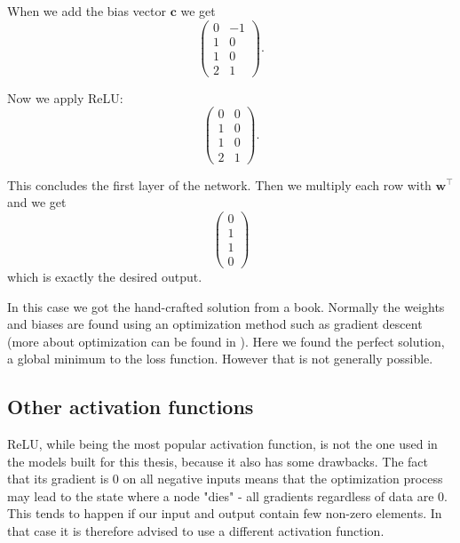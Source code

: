 When we add the bias vector $\textbf{c}$ we get 
$$
\left(\begin{matrix}
	0 & -1\\
	1 & 0\\
	1 & 0\\
	2 & 1
\end{matrix}\right).$$

Now we apply ReLU:
$$
\left(\begin{matrix}
	0 & 0\\
	1 & 0\\
	1 & 0\\
	2 & 1
\end{matrix}\right).$$

This concludes the first layer of the network. Then we multiply each row with $\textbf{w}^\top$ and we get
$$	
\left(\begin{matrix}
	0\\
	1\\
	1\\
	0
\end{matrix}\right)$$
which is exactly the desired output.

In this case we got the hand-crafted solution from a book. Normally the weights and biases are found using an optimization method such as gradient descent (more about optimization can be found in ). Here we found the perfect solution, a global minimum to the loss function. However that is not generally possible.

\subsection{Other activation functions}
\label{section:activation_functions}
ReLU, while being the most popular activation function, is not the one used in the models built for this thesis, because it also has some drawbacks. The fact that its gradient is $0$ on all negative inputs means that the optimization process may lead to the state where a node "dies" - all gradients regardless of data are 0. This tends to happen if our input and output contain few non-zero elements. In that case it is therefore advised to use a different activation function.

